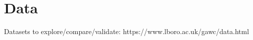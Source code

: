 \documentclass{article}
\begin{document}











\section{Data}

Datasets to explore/compare/validate: https://www.lboro.ac.uk/gawc/data.html


\end{document}
